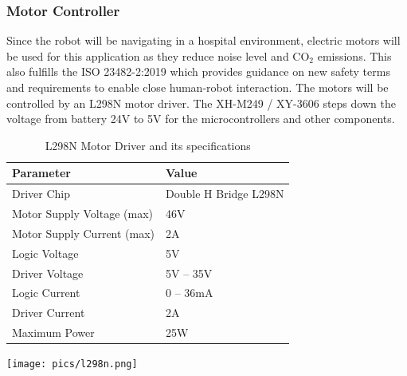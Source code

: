 \newpage


\subsubsection{Motor Controller}

\vspace{-0.6em}

Since the robot will be navigating in a hospital environment, electric motors will be used for this
application as they reduce noise level and CO$_2$ emissions. This also fulfills the ISO 23482-2:2019 which provides guidance
on new safety terms and requirements to enable close human-robot interaction. The motors will be controlled by an L298N motor driver. The
XH-M249 / XY-3606 steps down the voltage from battery 24V to 5V for the microcontrollers and other components.

\vspace{1em}


\begin{table}[h]
    \begin{minipage}{0.6\textwidth}
        \centering
        \renewcommand{\arraystretch}{2.0}
        \setlength{\tabcolsep}{4.4pt}
        \footnotesize
        \begin{tabular}{|p{4.5cm}|p{4.5cm}|}
          \hline
          \rowcolor[gray]{0.8} 
          \textbf{Parameter} & \textbf{Value} \\
          \hline
          Driver Chip &  Double H Bridge L298N \\
          \hline
          Motor Supply Voltage (max) & 46V \\
          \hline
          Motor Supply Current (max) & 2A \\
          \hline
          Logic Voltage & 5V \\
          \hline
          Driver Voltage & 5V -- 35V \\
          \hline
          Logic Current & 0 -- 36mA \\
          \hline
          Driver Current & 2A \\
          \hline
          Maximum Power & 25W \\
          \hline
        \end{tabular}
    \end{minipage}
    \begin{minipage}{0.36\textwidth}
        \centering
        \texttt{[image: pics/l298n.png]}
    \end{minipage}\hfill
    \caption{L298N Motor Driver and its specifications}\label{tab:l298n}
\end{table}


